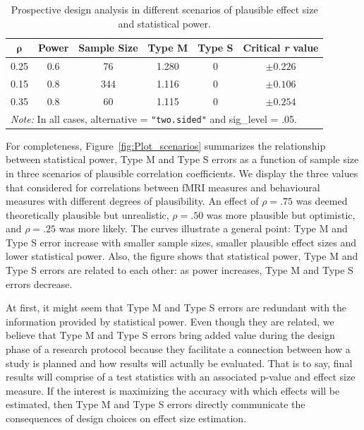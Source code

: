 \documentclass{article}\usepackage[]{graphicx}\usepackage[]{color}
\newenvironment{knitrout}{}{} %
\begin{document}
\begin{knitrout}
\color{fgcolor}\begin{table}[H]

\caption{\label{tab:Table_pro_r}Prospective design analysis in different scenarios of plausible effect size and statistical power.}
\centering
\begin{tabular}[t]{cccccc}
\toprule
\multicolumn{1}{c}{\textbf{$\bm{\rho}$}} & \multicolumn{1}{c}{\textbf{Power}} & \multicolumn{1}{c}{\textbf{Sample Size}} & \multicolumn{1}{c}{\textbf{Type M}} & \multicolumn{1}{c}{\textbf{Type S}} & \multicolumn{1}{c}{\textbf{Critical \textit{r} value}}\\
\midrule
0.25 & 0.6 & 76 & 1.280 & 0 & $\pm0.226$\\
0.15 & 0.8 & 344 & 1.116 & 0 & $\pm0.106$\\
0.35 & 0.8 & 60 & 1.115 & 0 & $\pm0.254$\\
\bottomrule
\multicolumn{6}{l}{\textit{Note: } In all cases, alternative  = \texttt{"two.sided"} and sig\_level = .05.}\\
\end{tabular}
\end{table}


\end{knitrout}

For completeness, Figure~\ref{fig:Plot_scenarios} summarizes the relationship between statistical power, Type M and Type S errors as a function of sample size in three scenarios of plausible correlation coefficients. We display the three values that \textcite{vulSuspiciouslyHighCorrelations2017} considered for correlations between fMRI measures and behavioural measures with different degrees of plausibility. An effect of $\rho=.75$ was deemed theoretically plausible but unrealistic, $\rho=.50$ was more plausible but optimistic, and $\rho=.25$ was more likely.  The curves illustrate a general point: Type M and Type S error increase with smaller sample sizes, smaller plausible effect sizes and lower statistical power. Also, the figure shows that statistical power, Type M and Type S errors are related to each other: as power increases, Type M and Type S errors decrease.

At first, it might seem that Type M and Type S errors are redundant with the information provided by statistical power. Even though they are related, we believe that Type M and Type S errors bring added value during the design phase of a research protocol because they facilitate a connection between how a study is planned and how results will actually be evaluated. That is to say, final results will comprise of a test statistics with an associated p-value and effect size measure. If the interest is maximizing the accuracy with which effects will be estimated, then Type M and Type S errors directly communicate the consequences of design choices on effect size estimation.
\end{document}
